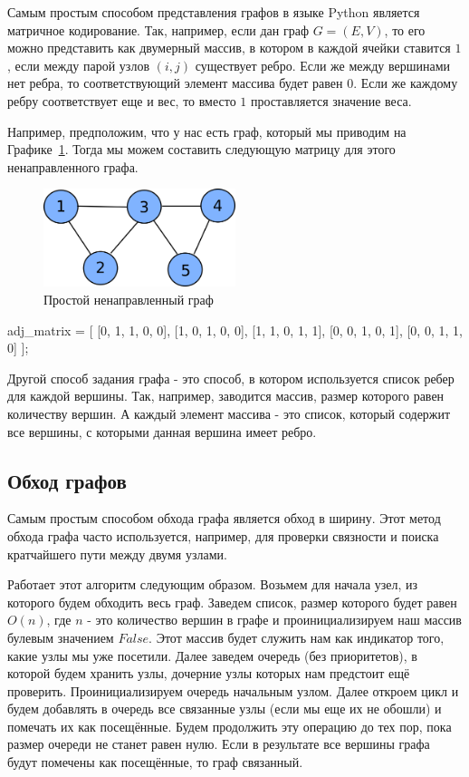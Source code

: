 Самым простым способом представления графов в языке 
Python является матричное кодирование. Так, например,
если дан граф $G=(E, V)$, то его можно представить как
двумерный массив, в котором в каждой ячейки ставится 
$1$, если между парой узлов $(i, j)$ существует ребро.
Если же между вершинами нет ребра, то соответствующий 
элемент массива будет равен $0$. Если же каждому ребру 
соответствует еще и вес, то вместо $1$ проставляется
значение веса.

Например, предположим, что у нас есть граф, который мы 
приводим на Графике~\ref{fig:example_graph}. Тогда
мы можем составить следующую матрицу для этого ненаправленного
графа.

\begin{figure}[h!]
\centering
\includegraphics[width=0.5\textwidth]{graphics/simple_graph.png}
\caption{Простой ненаправленный граф}
\label{fig:example_graph}
\end{figure}

\begin{python}
adj_matrix = [
	[0, 1, 1, 0, 0],
	[1, 0, 1, 0, 0],
	[1, 1, 0, 1, 1],
	[0, 0, 1, 0, 1],
	[0, 0, 1, 1, 0]
];
\end{python}

Другой способ задания графа - это способ, в котором используется 
список ребер для каждой вершины. Так, например, заводится массив, 
размер которого равен количеству вершин. А каждый элемент массива
- это список, который содержит все вершины, с которыми данная вершина
имеет ребро. 

\subsection{Обход графов}

Самым простым способом обхода графа является обход в ширину.
Этот метод обхода графа часто используется, например, для проверки 
связности и поиска кратчайшего пути между двумя узлами. 

Работает этот алгоритм следующим образом. Возьмем для начала
узел, из которого будем обходить весь граф. Заведем список, размер 
которого будет равен $O(n)$, где $n$ - это количество вершин в графе
и проинициализируем наш массив булевым значением $False$. 
Этот массив будет служить нам как индикатор того, какие узлы мы
уже посетили. Далее заведем очередь (без приоритетов), в которой 
будем хранить узлы, дочерние узлы которых нам предстоит ещё проверить. 
Проинициализируем очередь начальным узлом. 
Далее откроем цикл и будем добавлять в очередь все связанные узлы 
(если мы еще их не обошли) и помечать их как посещённые.
Будем продолжить эту операцию до тех пор, пока размер очереди 
не станет равен нулю. Если в результате все вершины 
графа будут помечены как посещённые, то граф связанный.

